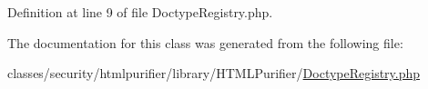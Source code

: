 Definition at line 9 of file Doctype\+Registry.\+php.



The documentation for this class was generated from the following file\+:\begin{DoxyCompactItemize}
\item 
classes/security/htmlpurifier/library/\+H\+T\+M\+L\+Purifier/\hyperlink{DoctypeRegistry_8php}{Doctype\+Registry.\+php}\end{DoxyCompactItemize}

